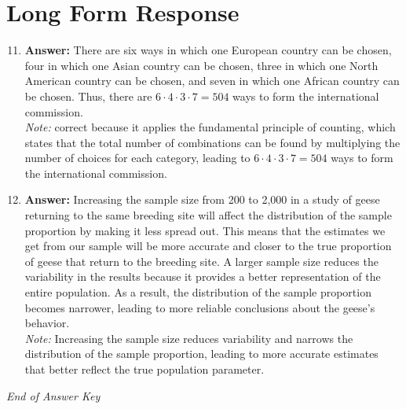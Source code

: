\documentclass[12pt]{article}
\begin{document}
\section*{Long Form Response}
\begin{enumerate}[label=\arabic*.]
\setcounter{enumi}{10}
\item \textbf{Answer:} There are six ways in which one European country can be chosen, four in which one Asian country can be chosen, three in which one North American country can be chosen, and seven in which one African country can be chosen. Thus, there are $6 \cdot 4 \cdot 3 \cdot 7 = \boxed{504}$ ways to form the international commission.
\\ \textit{Note:} correct because it applies the fundamental principle of counting, which states that the total number of combinations can be found by multiplying the number of choices for each category, leading to $6 \cdot 4 \cdot 3 \cdot 7 = 504$ ways to form the international commission.
\item \textbf{Answer:} Increasing the sample size from 200 to 2,000 in a study of geese returning to the same breeding site will affect the distribution of the sample proportion by making it less spread out. This means that the estimates we get from our sample will be more accurate and closer to the true proportion of geese that return to the breeding site. A larger sample size reduces the variability in the results because it provides a better representation of the entire population. As a result, the distribution of the sample proportion becomes narrower, leading to more reliable conclusions about the geese's behavior.
\\ \textit{Note:} Increasing the sample size reduces variability and narrows the distribution of the sample proportion, leading to more accurate estimates that better reflect the true population parameter.
\end{enumerate}

\vfill
\noindent\textit{End of Answer Key}
\end{document}
